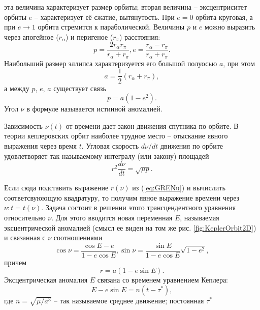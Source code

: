 эта величина характеризует размер орбиты; вторая величина -- эксцентриситет орбиты $e$ --
характеризует её сжатие, вытянутость. При $e = 0$ орбита круговая, а при $e \rightarrow 1$
орбита стремится к параболической. Величины $p$ и $e$ можно выразить через апогейное
($r_{\alpha}$) и перигеное ($r_{\pi}$) расстояния:
\begin{equation}
  p = \frac{2r_{\alpha}r_{\pi}}{r_{\alpha} + r_{\pi}},
  e = \frac{r_{\alpha} - r_{\pi}}{r_{\alpha} + r_{\pi}}.
\end{equation}
Наибольший размер эллипса характеризуется его большой полуосью $a$, при этом
\begin{equation}
  a = \frac{1}{2}(r_{\alpha} + r_{\pi}),
\end{equation}
а между $p$, $e$, $a$ существует связь
\begin{equation}
  p = a(1 - e^2).
\end{equation}
Угол $\nu$ в формуле \label{eq:GRENu} называется истинной аномалией.\par
Зависимость $\nu(t)$ от времени дает закон движения спутника по орбите. В теории
кеплеровских орбит наиболее трудное место -- отыскание явного выражения через время
$t$. Угловая скорость $d\nu/dt$ движения по орбите удовлетворяет так называемому
интегралу (или закону) площадей
\begin{equation} \label{eq:GIntegralSquares}
  r^2\frac{d\nu}{dt} = \sqrt{\mu p}.
\end{equation}\par
Если сюда подставить выражение $r(\nu)$ из (\ref{eq:GRENu}) и вычислить соответсвуюющую
квадратуру, то получим явное выражение времени через $\nu: t = t(\nu)$. Задача состоит
в решении этого трансцендентного уравнения относительно $\nu$. Для этого вводится
новая переменная $E$, называемая эксцентрической аномалией (смысл ее виден на том
же рис. \ref{fig:KeplerOrbit2D}) и связанная с $\nu$ соотношениями
\begin{equation}
  \cos\nu = \frac{\cos E - e}{1 - e\cos E}, \sin\nu = \frac{\sin E}{1 - e\cos E}\sqrt{1 - e^2},
\end{equation}
причем
\begin{equation}
  r = a(1 - e\sin E).
\end{equation}
Эксцентрическая аномалия $E$ связана со временем уравнением Кеплера:
\begin{equation} \label{eq:EscentricAnomaly}
  E - e\sin E = n(t-\tau^*),
\end{equation}
где $n = \sqrt{\mu/a^3}$ -- так называемое среднее движение; постоянная $\tau^*$

